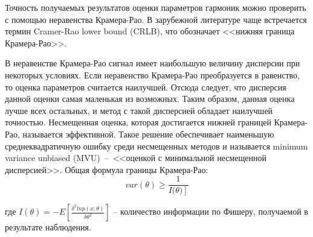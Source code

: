 Точность получаемых результатов оценки параметров гармоник можно проверить с помощью неравенства Крамера-Рао. В зарубежной литературе чаще встречается термин Cramer-Rao lower bound (CRLB), что обозначает <<нижняя граница Крамера-Рао>>. 

В неравенстве Крамера-Рао сигнал имеет наибольшую величину дисперсии при некоторых условиях. Если неравенство Крамера-Рао преобразуется в равенство, то оценка параметров считается наилучшей. Отсюда следует, что дисперсия данной оценки самая маленькая из возможных. Таким образом, данная оценка лучше всех остальных, и метод с такой дисперсией обладает наилучшей точностью. Несмещенная оценка, которая достигается нижней границей Крамера-Рао, называется эффективной. Такое решение обеспечивает наименьшую среднеквадратичную ошибку среди несмещенных методов и называется minimum variance unbiased (MVU)~--~<<оценкой с минимальной несмещенной дисперсией>>. Общая формула границы Крамера-Рао:
\begin{equation}
	\label{eq:equation2}
	var(\theta)\geq\frac{1}{I(\left.\theta)\right]}
\end{equation}

где $I(\theta)=-E\left[\frac{\delta^2 ln p(x;\theta)}{\delta\theta^2}\right]$ -- количество информации по Фишеру, получаемой в результате наблюдения.

